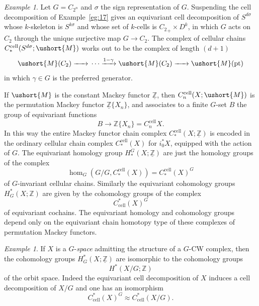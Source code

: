\documentclass{amsart}
\theoremstyle{definition}
\theoremstyle{remark}
\newtheorem{eg}[equation]{Example}
\newcommand{\Z}{{\mathbb Z}}
\newcommand{\Zm}{\underline{\Z}}
\newcommand{\Mm}{\ushort{M}}
\newcommand{\zt}{C_{2}}
\newcommand{\ztn}{C_{2^{n}}}
\begin{document}
\begin{eg}
\label{eg:23} Let $G=\ztn$ and $\sigma$ the sign representation of
$G$.  Suspending the cell decomposition of Example~\ref{eg:17} gives
an equivariant cell decomposition of $S^{d\sigma}$ whose $k$-skeleton
is $S^{k\sigma}$ and whose set of $k$-cells is ${\zt}_{+}\times
D^{k}$, in which $G$ acts on $\zt$ through the unique surjective map
$G\to \zt$.  The complex of cellular chains
$C_{\ast}^{\text{cell}}(S^{d\sigma};\Mm)$ works out to be the complex of
length $(d+1)$
\[
\Mm(\zt) \xrightarrow{\phantom{1+\gamma}}{}
\cdots
\xrightarrow{1-\gamma}{}
\Mm(\zt)\xrightarrow{\phantom{1+\gamma}}{}\Mm(\text{pt})
\]
in which $\gamma\in G$ is the preferred generator.   
\end{eg}

If $\Mm$ is the constant Mackey functor $\Zm$, then
$C_{n}^{\text{cell}}(X;\Mm)$ is the permutation Mackey functor
$\Zm\{{X_{n}}\}$, and associates to a finite $G$-set $B$ the group of
equivariant functions
\[
B\to \Z\{X_{n} \}=C_{n}^{\text{cell}}X.
\]
In this way the entire Mackey functor chain complex
$C_{\ast}^{\text{cell}}(X;\Zm)$ is encoded in the ordinary cellular
chain complex $C_{\ast}^{\text{cell}}(X)$ for $i_{0}^{\ast}X$,
equipped with the action of $G$.  The equivariant homology group
$H_{\ast}^{G}(X;\Zm)$ are just the homology groups of the complex
\[
\hom_{G}(G/G, C_{\ast}^{\text{cell}}(X)) = C_{\ast}^{\text{cell}}(X)^{G}
\]
of $G$-invariant cellular chains.   Similarly the equivariant
cohomology groups $H^{\ast}_{G}(X;\Z)$ are given by the cohomology
groups of the complex
\[
C^{\ast}_{\text{cell}}(X)^{G}
\]
of equivariant cochains.  The equivariant homology and cohomology
groups depend only on the equivariant chain homotopy type of these
complexes of permutation Mackey functors.

\begin{eg}
\label{eg:26} If $X$ is a $G$-{\em space} admitting the structure of a
$G$-CW complex, then the cohomology groups $H^{\ast}_{G}(X;\Zm)$ are
isomorphic to the cohomology groups
\[
H^{\ast}(X/G;\Z)
\]
of the orbit space.   Indeed the equivariant cell decomposition of $X$
induces a cell decomposition of $X/G$ and one has an isomorphism
\[
C^{\ast}_{\text{cell}}(X)^{G} \approx 
C^{\ast}_{\text{cell}}(X/G).
\]
\end{eg}
\end{document}
